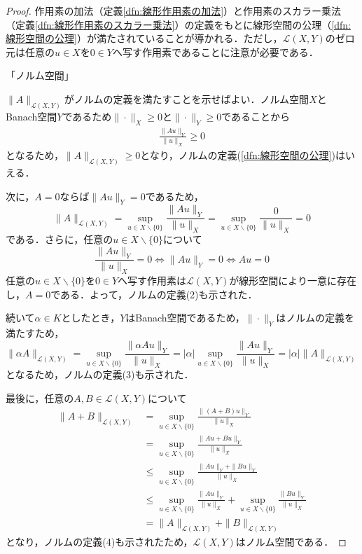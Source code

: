 \documentclass[11pt,a4paper,titlepage]{jsreport}
\theoremstyle{definition}
\begin{document}
\begin{proof}
  作用素の加法（定義\ref{dfn:線形作用素の加法}）と作用素のスカラー乗法（定義\ref{dfn:線形作用素のスカラー乗法}）の定義をもとに線形空間の公理（\ref{dfn:線形空間の公理}）が満たされていることが導かれる．ただし，$\mathcal{L}(X,Y)$のゼロ元は任意の$u\in X$を$0\in Y$へ写す作用素であることに注意が必要である．

  「ノルム空間」

  $\|A\|_{\mathcal{L}(X,Y)}$がノルムの定義を満たすことを示せばよい．ノルム空間$X$とBanach空間$Y$であるため$\|\cdot\|_X\geq 0$と$\|\cdot\|_Y\geq 0$であることから
  \begin{align*}
    \frac{\|Au\|_Y}{\|u\|_X} \geq 0
  \end{align*}
  となるため，$\|A\|_{\mathcal{L}(X,Y)}\geq 0$となり，ノルムの定義(\ref{dfn:線形空間の公理})はいえる．

  次に，$A=0$ならば$\|Au\|_Y=0$であるため，
  \begin{equation*}
    \|A\|_{\mathcal{L}(X,Y)}=\sup_{u\in X\backslash \{0\}} \frac{\|Au\|_Y}{\|u\|_X} = \sup_{u\in X\backslash \{0\}} \frac{0}{\|u\|_X} = 0
  \end{equation*}
  である．さらに，任意の$u\in X\backslash\{0\}$について
  \begin{equation*}
    \frac{\|Au\|_Y}{\|u\|_X} = 0 \Leftrightarrow \|Au\|_Y=0 \Leftrightarrow Au=0
  \end{equation*}
  任意の$u\in X\backslash \{0\}$を$0\in Y$へ写す作用素は$\mathcal{L}(X,Y)$が線形空間により一意に存在し，$A=0$である．よって，ノルムの定義(2)も示された．

  続いて$\alpha\in K$としたとき，$Y$はBanach空間であるため，$\|\cdot\|_Y$はノルムの定義を満たすため，
  \begin{equation*}
    \|\alpha A\|_{\mathcal{L}(X,Y)} = \sup_{u\in X\backslash \{0\}} \frac{\|\alpha Au\|_Y}{\|u\|_X} = |\alpha|\sup_{u\in X\backslash \{0\}} \frac{\| Au\|_Y}{\|u\|_X} = |\alpha|\|A\|_{\mathcal{L}(X,Y)}
  \end{equation*}
  となるため，ノルムの定義(3)も示された．

  最後に，任意の$A,B\in \mathcal{L}(X,Y)$について
  \begin{align*}
    \|A+B\|_{\mathcal{L}(X,Y)} & = \sup_{u\in X\backslash \{0\}} \frac{\|(A+B)u\|_Y}{\|u\|_X}                                                    \\
                               & = \sup_{u\in X\backslash \{0\}} \frac{\|Au+Bu\|_Y}{\|u\|_X}                                                     \\
                               & \leq \sup_{u\in X\backslash \{0\}} \frac{\|Au\|_Y + \|Bu\|_Y}{\|u\|_X}                                              \\
                               & \leq \sup_{u\in X\backslash \{0\}} \frac{\|Au\|_Y}{\|u\|_X} + \sup_{u\in X\backslash \{0\}} \frac{\|Bu\|_Y}{\|u\|_X} \\
                               & = \|A\|_{\mathcal{L}(X,Y)} + \|B\|_{\mathcal{L}(X,Y)}
  \end{align*}
  となり，ノルムの定義(4)も示されたため，$\mathcal{L}(X,Y)$はノルム空間である．


\end{proof}
\end{document}
